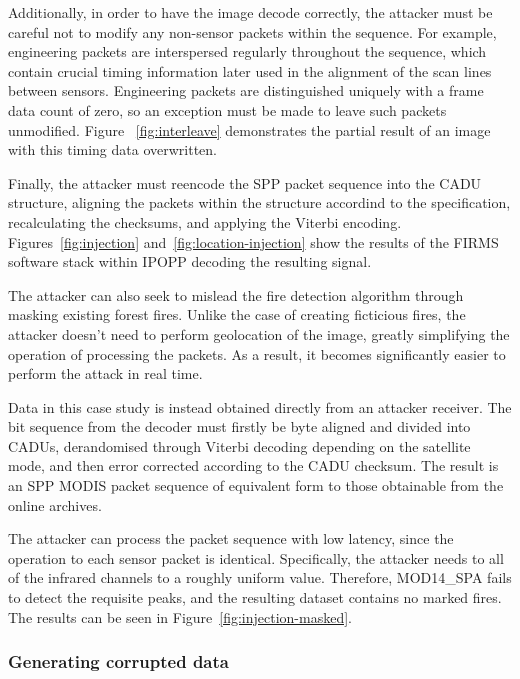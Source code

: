 Additionally, in order to have the image decode correctly, the attacker must be careful not to modify any non-sensor packets within the sequence.
For example, engineering packets are interspersed regularly throughout the sequence, which contain crucial timing information later used in the alignment of the scan lines between sensors.
Engineering packets are distinguished uniquely with a frame data count of zero, so an exception must be made to leave such packets unmodified.
Figure ~\ref{fig:interleave} demonstrates the partial result of an image with this timing data overwritten.

Finally, the attacker must reencode the SPP packet sequence into the CADU structure, aligning the packets within the structure accordind to the specification, recalculating the checksums, and applying the Viterbi encoding.
Figures~\ref{fig:injection} and~\ref{fig:location-injection} show the results of the FIRMS software stack within IPOPP decoding the resulting signal.




The attacker can also seek to mislead the fire detection algorithm through masking existing forest fires.
Unlike the case of creating ficticious fires, the attacker doesn't need to perform geolocation of the image, greatly simplifying the operation of processing the packets.
As a result, it becomes significantly easier to perform the attack in real time.

Data in this case study is instead obtained directly from an attacker receiver.
The bit sequence from the decoder must firstly be byte aligned and divided into CADUs, derandomised through Viterbi decoding depending on the satellite mode, and then error corrected according to the CADU checksum.
The result is an SPP MODIS packet sequence of equivalent form to those obtainable from the online archives.

The attacker can process the packet sequence with low latency, since the operation to each sensor packet is identical.
Specifically, the attacker needs to all of the infrared channels to a roughly uniform value.
Therefore, MOD14\_SPA fails to detect the requisite peaks, and the resulting dataset contains no marked fires.
The results can be seen in Figure~\ref{fig:injection-masked}.

\subsubsection{Generating corrupted data}


